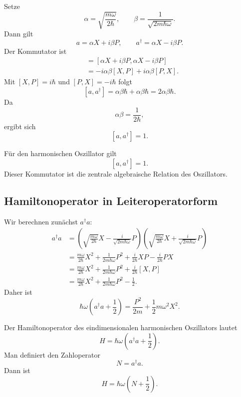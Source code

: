 \begin{derivationbox}
Setze
\[
    \alpha=\sqrt{\frac{m\omega}{2\hbar}},\qquad
    \beta=\frac{1}{\sqrt{2m\hbar\omega}}.
\]
Dann gilt
\[
    a=\alpha X+i\beta P,
    \qquad
    a^\dagger=\alpha X-i\beta P.
\]
Der Kommutator ist
\begin{align*}
    [a,a^\dagger]
    &= [\alpha X+i\beta P,\alpha X-i\beta P] \\
    &= -i\alpha\beta[X,P]+i\alpha\beta[P,X].
\end{align*}
Mit $[X,P]=i\hbar$ und $[P,X]=-i\hbar$ folgt
\[
    [a,a^\dagger]=\alpha\beta\hbar+\alpha\beta\hbar=2\alpha\beta\hbar.
\]
Da
\[
    \alpha\beta=\frac{1}{2\hbar},
\]
ergibt sich
\[
    [a,a^\dagger]=1.
\]
\end{derivationbox}

\begin{formulabox}
Für den harmonischen Oszillator gilt
\[
    [a,a^\dagger]=1.
\]
Dieser Kommutator ist die zentrale algebraische Relation des Oszillators.
\end{formulabox}

\subsection{Hamiltonoperator in Leiteroperatorform}

Wir berechnen zunächst $a^\dagger a$:
\begin{align*}
    a^\dagger a
    &=\left(\sqrt{\frac{m\omega}{2\hbar}}X-\frac{i}{\sqrt{2m\hbar\omega}}P\right)
      \left(\sqrt{\frac{m\omega}{2\hbar}}X+\frac{i}{\sqrt{2m\hbar\omega}}P\right) \\
    &=\frac{m\omega}{2\hbar}X^2+\frac{1}{2m\hbar\omega}P^2
      +\frac{i}{2\hbar}XP-\frac{i}{2\hbar}PX \\
    &=\frac{m\omega}{2\hbar}X^2+\frac{1}{2m\hbar\omega}P^2
      +\frac{i}{2\hbar}[X,P] \\
    &=\frac{m\omega}{2\hbar}X^2+\frac{1}{2m\hbar\omega}P^2-\frac12.
\end{align*}
Daher ist
\[
    \hbar\omega\left(a^\dagger a+\frac12\right)
    =\frac{P^2}{2m}+\frac12m\omega^2X^2.
\]

\begin{formulabox}
Der Hamiltonoperator des eindimensionalen harmonischen Oszillators lautet
\[
    H=\hbar\omega\left(a^\dagger a+\frac12\right).
\]
Man definiert den Zahloperator
\[
    N=a^\dagger a.
\]
Dann ist
\[
    H=\hbar\omega\left(N+\frac12\right).
\]
\end{formulabox}

